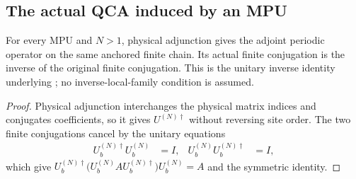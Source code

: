 \subsection{The actual QCA induced by an MPU}
\label{sec:mpu_actual_qca}

\begin{lemma}
    \label{lem:mpu_actual_finite_adjoint_inverse}
    \leanok
    For every MPU and $N>1$, physical adjunction gives the adjoint
    periodic operator on the same anchored finite chain. Its actual
    finite conjugation is the inverse of the original finite
    conjugation. This is the unitary inverse identity underlying
    \cite[lines~2300--2306]{Cirac2017MPU}; no inverse-local-family
    condition is assumed.
\end{lemma}
\begin{proof}
    \leanok
    Physical adjunction interchanges the physical matrix indices and
    conjugates coefficients, so it gives $U^{(N)\dagger}$ without
    reversing site order. The two finite conjugations cancel by the
    unitary equations
    \begin{align}
        U_b^{(N)\dagger}U_b^{(N)} & =I, & U_b^{(N)}U_b^{(N)\dagger} & =I,
        \label{eq:mpu_actual_finite_unitary_pair}
    \end{align}
    which give
    $U_b^{(N)\dagger}\bigl(U_b^{(N)}AU_b^{(N)\dagger}\bigr)U_b^{(N)}=A$
    and the symmetric identity.
\end{proof}

